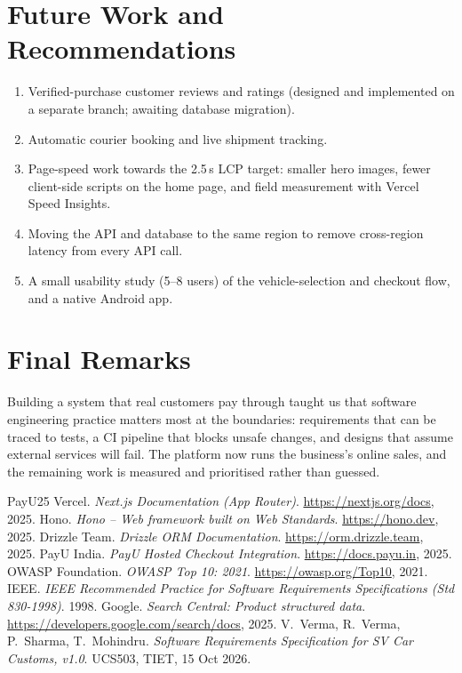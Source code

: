 \documentclass{tietreport}
\begin{document}
\section{Future Work and Recommendations}

\begin{enumerate}
  \item Verified-purchase customer reviews and ratings (designed and
        implemented on a separate branch; awaiting database migration).
  \item Automatic courier booking and live shipment tracking.
  \item Page-speed work towards the 2.5\,s LCP target: smaller hero images,
        fewer client-side scripts on the home page, and field measurement
        with Vercel Speed Insights.
  \item Moving the API and database to the same region to remove
        cross-region latency from every API call.
  \item A small usability study (5--8 users) of the vehicle-selection and
        checkout flow, and a native Android app.
\end{enumerate}

\section{Final Remarks}

Building a system that real customers pay through taught us that software
engineering practice matters most at the boundaries: requirements that can be
traced to tests, a CI pipeline that blocks unsafe changes, and designs that
assume external services will fail. The platform now runs the business's
online sales, and the remaining work is measured and prioritised rather than
guessed.

\begin{thebibliography}{PayU25}
 Vercel. \emph{Next.js Documentation (App Router)}. \url{https://nextjs.org/docs}, 2025.
 Hono. \emph{Hono -- Web framework built on Web Standards}. \url{https://hono.dev}, 2025.
 Drizzle Team. \emph{Drizzle ORM Documentation}. \url{https://orm.drizzle.team}, 2025.
 PayU India. \emph{PayU Hosted Checkout Integration}. \url{https://docs.payu.in}, 2025.
 OWASP Foundation. \emph{OWASP Top 10: 2021}. \url{https://owasp.org/Top10}, 2021.
 IEEE. \emph{IEEE Recommended Practice for Software Requirements Specifications (Std 830-1998)}. 1998.
 Google. \emph{Search Central: Product structured data}. \url{https://developers.google.com/search/docs}, 2025.
 V.~Verma, R.~Verma, P.~Sharma, T.~Mohindru. \emph{Software Requirements Specification for SV Car Customs, v1.0}. UCS503, TIET, 15 Oct 2026.
\end{thebibliography}
\end{document}
